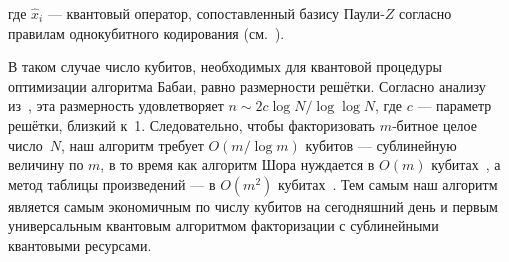 \noindent где $\hat{x}_i$ — квантовый оператор, сопоставленный базису Паули‑$Z$
согласно правилам однокубитного кодирования (см.~\cite{cite_31}).

В таком случае число кубитов, необходимых для квантовой процедуры оптимизации
алгоритма Бабаи, равно размерности решётки. Согласно анализу из \cite{cite_31},
эта размерность удовлетворяет $n\sim 2c\log N/\log\log N$, где $c$ — параметр
решётки, близкий к 1. Следовательно, чтобы факторизовать $m$‑битное целое
число $N$, наш алгоритм требует $O(m/\log m)$ кубитов — сублинейную величину по
$m$, в то время как алгоритм Шора нуждается в $O(m)$ кубитах \cite{cite_13}, а
метод таблицы произведений — в $O(m^{2})$ кубитах \cite{cite_25}. Тем самым наш
алгоритм является самым экономичным по числу кубитов на сегодняшний день и
первым универсальным квантовым алгоритмом факторизации с сублинейными
квантовыми ресурсами.
